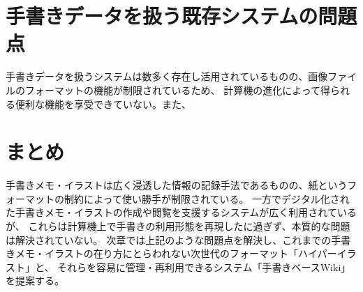 \section{手書きデータを扱う既存システムの問題点}
手書きデータを扱うシステムは数多く存在し活用されているものの、画像ファイルのフォーマットの機能が制限されているため、
計算機の進化によって得られる便利な機能を享受できていない。また、

\section{まとめ}
手書きメモ・イラストは広く浸透した情報の記録手法であるものの、紙というフォーマットの制約によって使い勝手が制限されている。
一方でデジタル化された手書きメモ・イラストの作成や閲覧を支援するシステムが広く利用されているが、
これらは計算機上で手書きの利用形態を再現したに過ぎず、本質的な問題は解決されていない。
次章では上記のような問題点を解決し、これまでの手書きメモ・イラストの在り方にとらわれない次世代のフォーマット「ハイパーイラスト」と、
それらを容易に管理・再利用できるシステム「手書きベースWiki」を提案する。